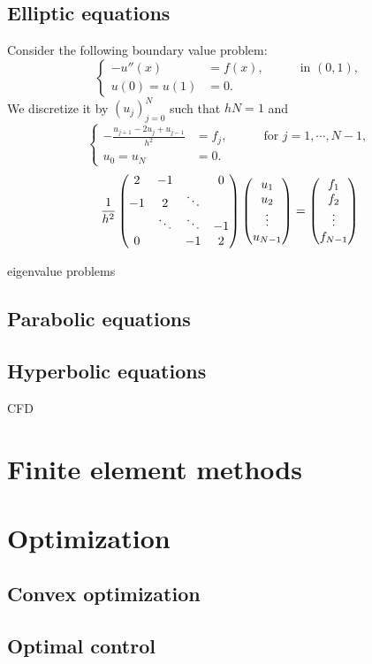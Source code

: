 \documentclass{../../large}
\begin{document}
\section{Elliptic equations}
\begin{prb}
Consider the following boundary value problem:
\[\left\{\begin{alignedat}{2}
-u''(x)&=f(x),&\quad&\text{ in }(0,1),\\
u(0)=u(1)&=0.&&
\end{alignedat}\right.\]
We discretize it by $(u_j)_{j=0}^N$ such that $hN=1$ and
\[\left\{\begin{alignedat}{2}
-\frac{u_{j+1}-2u_j+u_{j-1}}{h^2}&=f_j,&\quad&\text{ for }j=1,\cdots,N-1,\\
u_0=u_N&=0.&&
\end{alignedat}\right.\]
\[\frac1{h^2}\begin{pmatrix}2&-1&&0\\-1&2&\ddots&\\&\ddots&\ddots&-1\\0&&-1&2\end{pmatrix}\begin{pmatrix}u_1\\u_2\\\vdots\\u_{N-1}\end{pmatrix}=\begin{pmatrix}f_1\\f_2\\\vdots\\f_{N-1}\end{pmatrix}\]
\end{prb}
eigenvalue problems

\section{Parabolic equations}


\section{Hyperbolic equations}
CFD

\chapter{Finite element methods}



\chapter{Optimization}
\section{Convex optimization}
\section{Optimal control}
\end{document}
